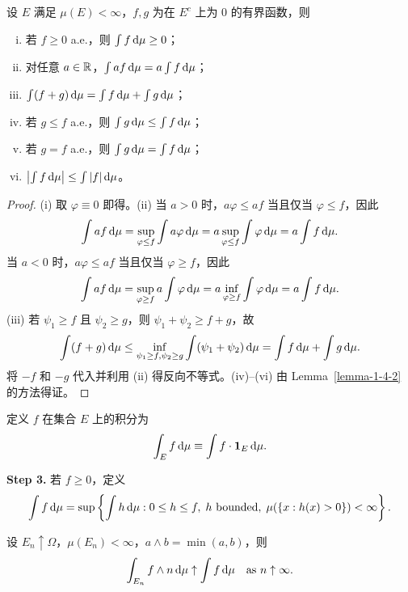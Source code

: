 \begin{lemma}\label{lemma-1-4-3}
    设 $E$ 满足 $\mu(E) < \infty$，$f,g$ 为在 $E^c$ 上为 $0$ 的有界函数，则
    \begin{enumerate}[(i)]
        \item 若 $f \ge 0$ a.e.，则 $\int f \,\mathrm{d}\mu \ge 0$；
        \item 对任意 $a \in \mathbb{R}$，$\int af \,\mathrm{d}\mu = a \int f \,\mathrm{d}\mu$；
        \item $\int (f+g) \,\mathrm{d}\mu = \int f \,\mathrm{d}\mu + \int g \,\mathrm{d}\mu$；
        \item 若 $g \le f$ a.e.，则 $\int g \,\mathrm{d}\mu \le \int f \,\mathrm{d}\mu$；
        \item 若 $g = f$ a.e.，则 $\int g \,\mathrm{d}\mu = \int f \,\mathrm{d}\mu$；
        \item $\left|\int f \,\mathrm{d}\mu\right| \le \int |f| \,\mathrm{d}\mu$。
    \end{enumerate}
\end{lemma}

\begin{proof}
    (i) 取 $\varphi \equiv 0$ 即得。(ii) 当 $a > 0$ 时，$a\varphi \le af$ 当且仅当 $\varphi \le f$，因此
    \[
        \int af \,\mathrm{d}\mu = \sup_{\varphi \le f} \int a\varphi \,\mathrm{d}\mu = a \sup_{\varphi \le f} \int \varphi \,\mathrm{d}\mu = a \int f \,\mathrm{d}\mu.
    \]
    当 $a < 0$ 时，$a\varphi \le af$ 当且仅当 $\varphi \ge f$，因此
    \[
        \int af \,\mathrm{d}\mu = \sup_{\varphi \ge f} a \int \varphi \,\mathrm{d}\mu = a \inf_{\varphi \ge f} \int \varphi \,\mathrm{d}\mu = a \int f \,\mathrm{d}\mu.
    \]
    (iii) 若 $\psi_1 \ge f$ 且 $\psi_2 \ge g$，则 $\psi_1 + \psi_2 \ge f+g$，故
    \[
        \int (f+g) \,\mathrm{d}\mu \le \inf_{\psi_1 \ge f, \psi_2 \ge g} \int (\psi_1 + \psi_2) \,\mathrm{d}\mu = \int f \,\mathrm{d}\mu + \int g \,\mathrm{d}\mu.
    \]
    将 $-f$ 和 $-g$ 代入并利用 (ii) 得反向不等式。(iv)--(vi) 由 Lemma~\ref{lemma-1-4-2} 的方法得证。
\end{proof}

\medskip{} 定义 $f$ 在集合 $E$ 上的积分为
\[
    \int_E f \,\mathrm{d}\mu \equiv \int f \cdot \mathbf{1}_E \,\mathrm{d}\mu.
\]

\medskip\noindent\textbf{Step 3.} 若 $f \ge 0$，定义
\[
    \int f \,\mathrm{d}\mu = \sup \left\{ \int h \,\mathrm{d}\mu : 0 \le h \le f, \; h \text{ bounded}, \; \mu(\{x : h(x) > 0\}) < \infty \right\}.
\]

\begin{lemma}\label{lemma-1-4-4}
    设 $E_n \uparrow \Omega$，$\mu(E_n) < \infty$，$a \wedge b = \min(a,b)$，则
    \[
        \int_{E_n} f \wedge n \,\mathrm{d}\mu \uparrow \int f \,\mathrm{d}\mu \quad \text{as } n \uparrow \infty.
    \]
\end{lemma}

